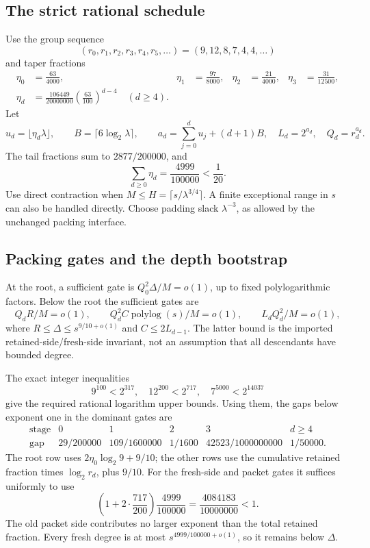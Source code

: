 \subsection{The strict rational schedule}

Use the group sequence
\[
 (r_0,r_1,r_2,r_3,r_4,r_5,\ldots)=(9,12,8,7,4,4,\ldots)
\]
and taper fractions
\begin{align*}
 \eta_0&=\frac{63}{4000},&
 \eta_1&=\frac{97}{8000},&
 \eta_2&=\frac{21}{4000},&
 \eta_3&=\frac{31}{12500},\\
 \eta_d&=\frac{106449}{20000000}
             \left(\frac{63}{100}\right)^{d-4}\quad(d\ge4).
\end{align*}
Let
\[
 u_d=\lfloor\eta_d\lambda\rfloor,\qquad
 B=\lceil6\log_2\lambda\rceil,\qquad
 a_d=\sum_{j=0}^d u_j+(d+1)B,
 \quad L_d=2^{a_d},\quad Q_d=r_d^{a_d}.
\]
The tail fractions sum to $2877/200000$, and
\begin{equation}\label{eq:new-total-retention}
 \sum_{d\ge0}\eta_d=\frac{4999}{100000}<\frac1{20}.
\end{equation}
Use direct contraction when $M\le H=\lceil s/\lambda^{3/4}\rceil$.
A finite exceptional range in $s$ can also be handled directly. Choose
padding slack $\lambda^{-3}$, as allowed by the unchanged packing interface.

\subsection{Packing gates and the depth bootstrap}

At the root, a sufficient gate is $Q_0^2\Delta/M=o(1)$, up to fixed
polylogarithmic factors. Below the root the sufficient gates are
\[
 Q_dR/M=o(1),\qquad
 Q_d^2C\operatorname{polylog}(s)/M=o(1),\qquad
 L_dQ_d^2/M=o(1),
\]
where $R\le\Delta\le s^{9/10+o(1)}$ and
$C\le2L_{d-1}$. The latter bound is the imported retained-side/fresh-side
invariant, not an assumption that all descendants have bounded degree.

The exact integer inequalities
\[
 9^{100}<2^{317},\quad 12^{200}<2^{717},\quad
 7^{5000}<2^{14037}
\]
give the required rational logarithm upper bounds. Using them, the gaps
below exponent one in the dominant gates are
\[
\begin{array}{c|ccccc}
 \text{stage}&0&1&2&3&d\ge4\\ \hline
 \text{gap}&29/200000&109/1600000&1/1600&
 42523/1000000000&1/50000.
\end{array}
\]
The root row uses $2\eta_0\log_2 9+9/10$; the other rows use the cumulative
retained fraction times $\log_2r_d$, plus $9/10$.
For the fresh-side and packet gates it suffices uniformly to use
\[
 \left(1+2\cdot\frac{717}{200}\right)
       \frac{4999}{100000}
 =\frac{4084183}{10000000}<1.
\]
The old packet side contributes no larger exponent than the total retained
fraction. Every fresh degree is at most $s^{4999/100000+o(1)}$, so it remains
below $\Delta$.

